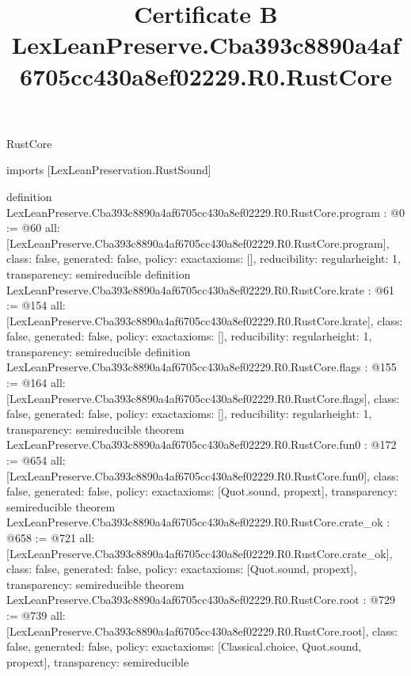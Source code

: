 \begin{lexlean}{RustCore}
\title{Certificate B LexLeanPreserve.Cba393c8890a4af6705cc430a8ef02229.R0.RustCore}
\begin{coremodule}
imports [LexLeanPreservation.RustSound]

definition LexLeanPreserve.Cba393c8890a4af6705cc430a8ef02229.R0.RustCore.program : @0 := @60 {
  all: [LexLeanPreserve.Cba393c8890a4af6705cc430a8ef02229.R0.RustCore.program],
  class: false,
  generated: false,
  policy: exact{axioms: []},
  reducibility: regular{height: 1},
  transparency: semireducible
}
definition LexLeanPreserve.Cba393c8890a4af6705cc430a8ef02229.R0.RustCore.krate : @61 := @154 {
  all: [LexLeanPreserve.Cba393c8890a4af6705cc430a8ef02229.R0.RustCore.krate],
  class: false,
  generated: false,
  policy: exact{axioms: []},
  reducibility: regular{height: 1},
  transparency: semireducible
}
definition LexLeanPreserve.Cba393c8890a4af6705cc430a8ef02229.R0.RustCore.flags : @155 := @164 {
  all: [LexLeanPreserve.Cba393c8890a4af6705cc430a8ef02229.R0.RustCore.flags],
  class: false,
  generated: false,
  policy: exact{axioms: []},
  reducibility: regular{height: 1},
  transparency: semireducible
}
theorem LexLeanPreserve.Cba393c8890a4af6705cc430a8ef02229.R0.RustCore.fun0 : @172 := @654 {
  all: [LexLeanPreserve.Cba393c8890a4af6705cc430a8ef02229.R0.RustCore.fun0],
  class: false,
  generated: false,
  policy: exact{axioms: [Quot.sound, propext]},
  transparency: semireducible
}
theorem LexLeanPreserve.Cba393c8890a4af6705cc430a8ef02229.R0.RustCore.crate_ok : @658 := @721 {
  all: [LexLeanPreserve.Cba393c8890a4af6705cc430a8ef02229.R0.RustCore.crate_ok],
  class: false,
  generated: false,
  policy: exact{axioms: [Quot.sound, propext]},
  transparency: semireducible
}
theorem LexLeanPreserve.Cba393c8890a4af6705cc430a8ef02229.R0.RustCore.root : @729 := @739 {
  all: [LexLeanPreserve.Cba393c8890a4af6705cc430a8ef02229.R0.RustCore.root],
  class: false,
  generated: false,
  policy: exact{axioms: [Classical.choice, Quot.sound, propext]},
  transparency: semireducible
}


\end{coremodule}
\end{lexlean}
